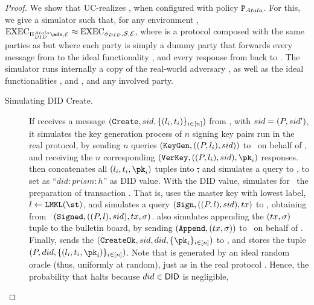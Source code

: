 \begin{proof}
  We show that \RealPKIDIDAtala UC-realizes \IdealGPKIDID, when configured
  with policy $\P_{Atala}$. For this, we give a simulator \Sim such that, for
  any environment \Env, $\Exec_{\RealPKIDIDAtala\adv,\Env} \approx
  \Exec_{\phiDID,\Sim,\Env}$,
  where \phiDID is a protocol composed with the same parties as
  \RealPKIDIDAtala but where each party is simply a dummy party that forwards
  every message from \Env to the ideal functionality \IdealGPKIDID, and every
  response from \IdealGPKIDID back to \Env. The simulator \Sim runs internally a
  copy of the real-world adversary \adv, as well as the ideal functionalities
  \IdealGRO, \IdealFSig and \IdealGdledger, and any involved party.

  \begin{description}
  \item[Simulating DID Create.] %
    If \Sim receives a message $(\uccmd{Create},\sid,\lbrace (\lbl_i,\typ_i)
    \rbrace_{i\in[n]})$ from \IdealGPKIDID, with $\sid=(P,\sid')$, it simulates
    the key generation process of $n$ signing key pairs run in the real
    protocol, by sending $n$ queries $(\uccmd{KeyGen},((P,\lbl_i),\sid))$ to
    \adv~on behalf of \IdealFSig, and receiving the $n$ corresponding
    $(\uccmd{VerKey},((P,\lbl_i),\sid),\pk_i)$ responses.
    \Sim then concatenates all $(\lbl_i,\typ_i,\pk_i)$ tuples into \st, and
    simulates a query to \IdealGRO, to set \did as ``$did:prism: h$'' as DID
    value.
    With the DID value, \Sim simulates for \adv~the preparation of transaction
    \tx. That is, \Sim uses the master key with lowest label, $\lbl \gets
    \LMKL(\st)$, and simulates a query $(\uccmd{Sign},((P,\lbl),\sid),\tx)$ to
    \IdealFSig, obtaining from \adv~$(\uccmd{Signed},((P,\lbl),\sid),\tx,\sig)$.
    \Sim also simulates appending the $(\tx,\sig)$ tuple to the bulletin board,
    by sending $(\uccmd{Append},(\tx,\sig))$ to \adv~on behalf of \IdealGdledger.
    Finally, \Sim sends the $(\uccmd{CreateOk},\sid,\did,\lbrace \pk_i
    \rbrace_{i\in[n]})$ to \IdealGPKIDID, and stores the tuple $(P,\did,\lbrace
    (\lbl_i,\typ_i,\pk_i)\rbrace_{i\in[n]})$.
    Note that \did is generated by an ideal random oracle (thus, uniformly at
    random), just as in the real protocol \RealPKIDIDAtala. Hence, the
    probability that \IdealGPKIDID halts because $\did \in \DID$ is negligible,

\end{description}
\end{proof}
